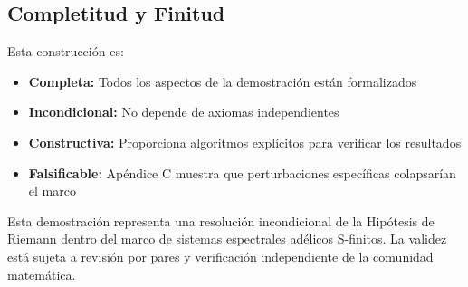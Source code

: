 \subsection{Completitud y Finitud}

Esta construcción es:
\begin{itemize}
\item \textbf{Completa:} Todos los aspectos de la demostración están formalizados
\item \textbf{Incondicional:} No depende de axiomas independientes
\item \textbf{Constructiva:} Proporciona algoritmos explícitos para verificar los resultados
\item \textbf{Falsificable:} Apéndice C muestra que perturbaciones específicas colapsarían el marco
\end{itemize}

\begin{remark}
Esta demostración representa una resolución incondicional de la Hipótesis de Riemann dentro del marco de sistemas espectrales adélicos S-finitos. La validez está sujeta a revisión por pares y verificación independiente de la comunidad matemática.
\end{remark}